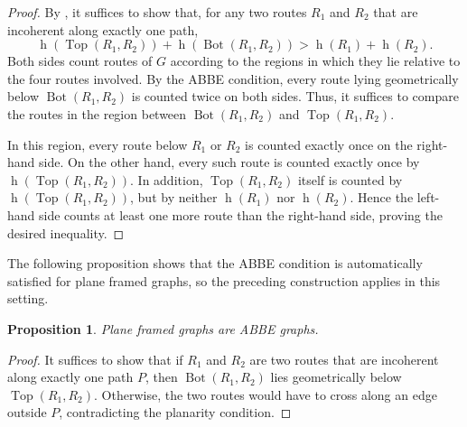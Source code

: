 \documentclass[12pt, reqno]{amsart}
\newcommand{\Top}{\operatorname{Top}}
\newcommand{\Bot}{\operatorname{Bot}}
\newcommand{\h}{\operatorname{h}}
\theoremstyle{plain}
\newtheorem{proposition}[theorem]{Proposition}
\theoremstyle{definition}
\numberwithin{equation}{section}
\begin{document}
\begin{proof}
By , it suffices to show that, for any two routes $R_1$ and $R_2$ that are incoherent along exactly one path,
\[
\h(\Top(R_1,R_2))+\h(\Bot(R_1,R_2))
>
\h(R_1)+\h(R_2).
\]
Both sides count routes of $G$ according to the regions in which they lie relative to the four routes involved. By the ABBE condition, every route lying geometrically below $\Bot(R_1,R_2)$ is counted twice on both sides. Thus, it suffices to compare the routes in the region between $\Bot(R_1,R_2)$ and $\Top(R_1,R_2)$.

In this region, every route below $R_1$ or $R_2$ is counted exactly once on the right-hand side. On the other hand, every such route is counted exactly once by $\h(\Top(R_1,R_2))$. In addition, $\Top(R_1,R_2)$ itself is counted by $\h(\Top(R_1,R_2))$, but by neither $\h(R_1)$ nor $\h(R_2)$. Hence the left-hand side counts at least one more route than the right-hand side, proving the desired inequality.
\end{proof}

The following proposition shows that the ABBE condition is automatically satisfied for plane framed graphs, so the preceding construction applies in this setting.

\begin{proposition}\label{prop_plane_framings_are_ABBE}
    Plane framed graphs are ABBE graphs.
\end{proposition}

\begin{proof}
It suffices to show that if $R_1$ and $R_2$ are two routes that are incoherent along exactly one path $P$, then $\Bot(R_1,R_2)$ lies geometrically below $\Top(R_1,R_2)$. Otherwise, the two routes would have to cross along an edge outside $P$, contradicting the planarity condition.
\end{proof}
\end{document}
